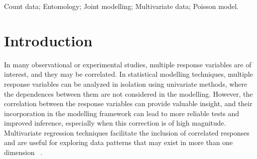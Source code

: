 \documentclass[useAMS,referee]{biom}
\begin{document}
%

\begin{keywords}
Count data; Entomology; Joint modelling; Multivariate data; Poisson model.
\end{keywords}


\maketitle



%

\section{Introduction}
\label{s:intro}

In many observational or experimental studies, multiple response variables are of interest, and they may be correlated. In statistical modelling techniques, multiple response variables can be analyzed in isolation using univariate methods, where the dependences between them are not considered in the modelling. However, the correlation between the response variables can provide valuable insight, and their incorporation in the modelling framework can lead to more reliable tests and improved inference, especially when this correction is of high magnitude. Multivariate regression techniques facilitate the inclusion of correlated responses and are useful for exploring data patterns that may exist in more than one dimension ~\citep{raykov2008introduction,everitt2011introduction}. 
\end{document}
